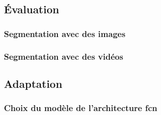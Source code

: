 \subsection{Évaluation}

\subsubsection{Segmentation avec des images}

\subsubsection{Segmentation avec des vidéos}

\subsection{Adaptation}

\subsubsection{Choix du modèle de l'architecture \acrshort{fcn}}
\label{section:choix_modele_architecture}
% 
% 